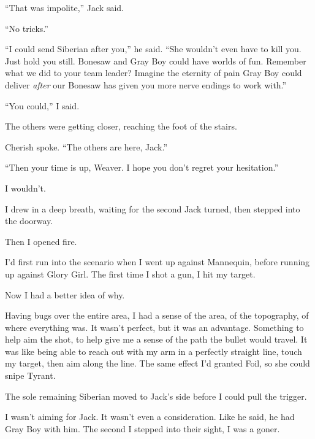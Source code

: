 ``That was impolite,'' Jack said.



``No tricks.''



``I could send Siberian after you,'' he said.  ``She wouldn't even have to kill you.  Just hold you still.  Bonesaw and Gray Boy could have worlds of fun.  Remember what we did to your team leader?  Imagine the eternity of pain Gray Boy could deliver \emph{after }our\emph{ }Bonesaw has given you more nerve endings to work with.''



``You could,'' I said.



The others were getting closer, reaching the foot of the stairs.



Cherish spoke.  ``The others are here, Jack.''



``Then your time is up, Weaver.  I hope you don't regret your hesitation.''



I wouldn't.



I drew in a deep breath, waiting for the second Jack turned, then stepped into the doorway.



Then I opened fire.



I'd first run into the scenario when I went up against Mannequin, before running up against Glory Girl.  The first time I shot a gun, I hit my target.



Now I had a better idea of why.



Having bugs over the entire area, I had a sense of the area, of the topography, of where everything was.  It wasn't perfect, but it was an advantage.  Something to help aim the shot, to help give me a sense of the path the bullet would travel.  It was like being able to reach out with my arm in a perfectly straight line, touch my target, then aim along the line.  The same effect I'd granted Foil, so she could snipe Tyrant.



The sole remaining Siberian moved to Jack's side before I could pull the trigger.



I wasn't aiming for Jack.  It wasn't even a consideration.  Like he said, he had Gray Boy with him.  The second I stepped into their sight, I was a goner.



